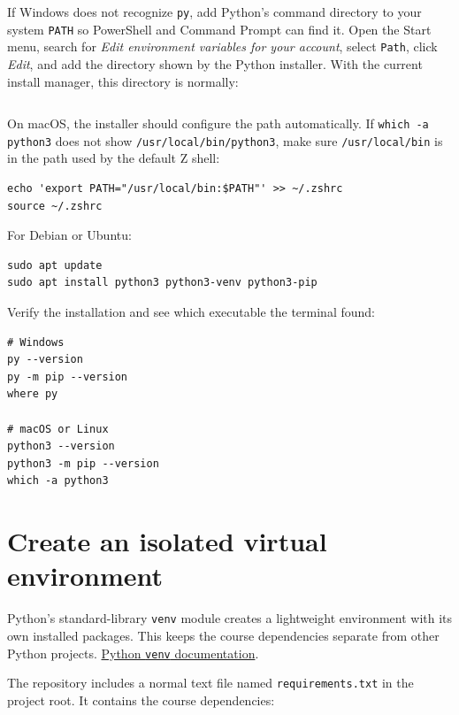 If Windows does not recognize \texttt{py}, add Python's command directory to your system \texttt{PATH} so PowerShell and Command Prompt can find it. Open the Start menu, search for \emph{Edit environment variables for your account}, select \texttt{Path}, click \emph{Edit}, and add the directory shown by the Python installer. With the current install manager, this directory is normally:

\begin{lstlisting}[style=mlterminal]
%LocalAppData%\Python\bin
\end{lstlisting}

On macOS, the installer should configure the path automatically. If \texttt{which -a python3} does not show \texttt{/usr/local/bin/python3}, make sure \texttt{/usr/local/bin} is in the path used by the default Z shell:

\begin{lstlisting}[style=mlterminal]
echo 'export PATH="/usr/local/bin:$PATH"' >> ~/.zshrc
source ~/.zshrc
\end{lstlisting}

For Debian or Ubuntu:

\begin{lstlisting}[style=mlterminal]
sudo apt update
sudo apt install python3 python3-venv python3-pip
\end{lstlisting}

Verify the installation and see which executable the terminal found:

\begin{lstlisting}[style=mlterminal]
# Windows
py --version
py -m pip --version
where py

# macOS or Linux
python3 --version
python3 -m pip --version
which -a python3
\end{lstlisting}

\section{Create an isolated virtual environment}

Python's standard-library \texttt{venv} module creates a lightweight environment with its own installed packages. This keeps the course dependencies separate from other Python projects. \href{https://docs.python.org/3/library/venv.html}{Python \texttt{venv} documentation}.

The repository includes a normal text file named \texttt{requirements.txt} in the project root. It contains the course dependencies:

